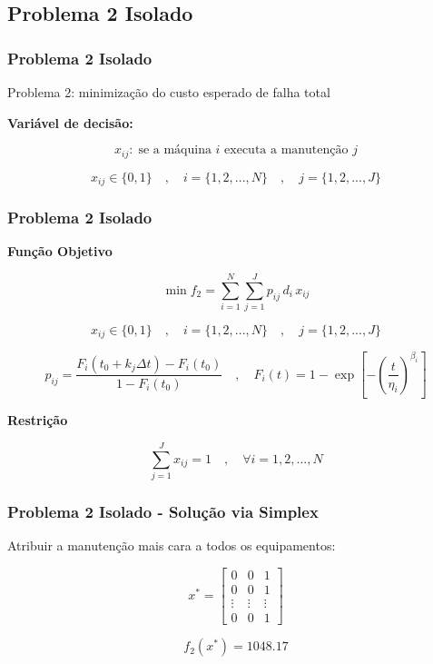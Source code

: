 \documentclass{beamer}
\newcommand{\un}[1]{\;\text{#1}}
\begin{document}
    \subsection{Problema 2 Isolado}
    \begin{frame}
        \frametitle{Problema 2 Isolado}

        \begin{center}
            Problema 2: minimização do custo esperado de falha total
        \end{center}

        \vspace{0.5cm}

        \textbf{Variável de decisão:}

        \[  x_{ij}: \un{se a máquina $i$ executa a manutenção $j$}  \]
        
        \[ x_{ij} \in \{0,1\} \quad , \quad i = \{1, 2, ..., N\}  \quad , \quad j = \{1, 2, ..., J\} \]

    \end{frame}

    \begin{frame}
        \frametitle{Problema 2 Isolado}

        \textbf{Função Objetivo}

        \[  \min f_2 = \sum_{i=1}^{N} \sum_{j=1}^{J} p_{ij} \, d_i \, x_{ij} \]

        \[ x_{ij} \in \{0,1\} \quad , \quad i = \{1, 2, ..., N\}  \quad , \quad j = \{1, 2, ..., J\} \]

        \[ 
        p_{ij} = \frac{F_i \left(t_0 + k_j \Delta t \right) - F_i\left(t_0\right) }{1 - F_i\left(t_0\right)}
        \quad , \quad 
        F_i(t) = 1 - \exp \left[ - \left( \frac{t}{\eta_i} \right)^{\beta_i} \right] 
        \]

        \vspace{0.5cm}
        
        \textbf{Restrição}

        \[ \sum_{j=1}^{J} x_{ij} = 1 \quad , \quad \forall i = {1, 2, ..., N} \]
    \end{frame}

    \begin{frame}
        \frametitle{Problema 2 Isolado - Solução via Simplex}

        \begin{center}
            Atribuir a manutenção mais cara a todos os equipamentos:
        \end{center}

        \[ x^{*} = \begin{bmatrix} 
            0 & 0 & 1 \\
            0 & 0 & 1 \\
            \vdots & \vdots & \vdots \\
            0 &  0      & 1 
            \end{bmatrix} \]

        \vspace{1cm}

       \[ f_2\left(x^{*}\right) = 1048.17 \]
    \end{frame}
\end{document}
